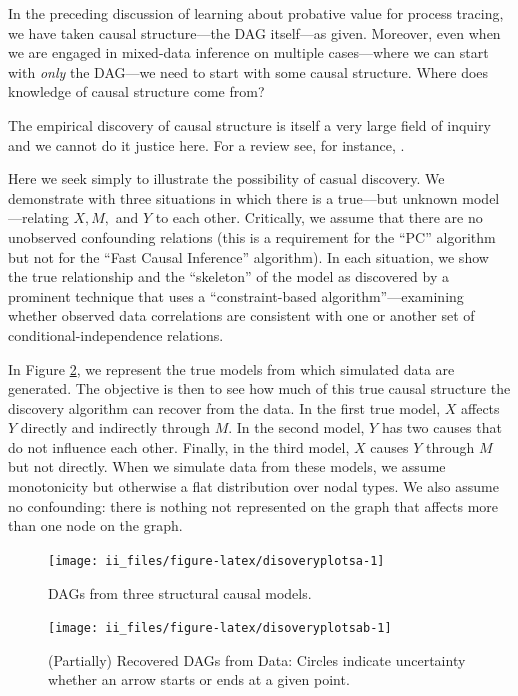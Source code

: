 \documentclass[
  12pt,
]{book}
\begin{document}
In the preceding discussion of learning about probative value for process tracing, we have taken causal structure---the DAG itself---as given. Moreover, even when we are engaged in mixed-data inference on multiple cases---where we can start with \emph{only} the DAG---we need to start with some causal structure. Where does knowledge of causal structure come from?

The empirical discovery of causal structure is itself a very large field of inquiry and we cannot do it justice here. For a review see, for instance, \citet{glymour2019review}.

Here we seek simply to illustrate the possibility of casual discovery. We demonstrate with three situations in which there is a true---but unknown model---relating \(X,M,\) and \(Y\) to each other. Critically, we assume that there are no unobserved confounding relations (this is a requirement for the ``PC'' algorithm but not for the ``Fast Causal Inference'' algorithm). In each situation, we show the true relationship and the ``skeleton'' of the model as discovered by a prominent technique that uses a ``constraint-based algorithm''---examining whether observed data correlations are consistent with one or another set of conditional-independence relations.

In Figure \ref{fig:disoveryplotsab}, we represent the true models from which simulated data are generated. The objective is then to see how much of this true causal structure the discovery algorithm can recover from the data. In the first true model, \(X\) affects \(Y\) directly and indirectly through \(M\). In the second model, \(Y\) has two causes that do not influence each other. Finally, in the third model, \(X\) causes \(Y\) through \(M\) but not directly. When we simulate data from these models, we assume monotonicity but otherwise a flat distribution over nodal types. We also assume no confounding: there is nothing not represented on the graph that affects more than one node on the graph.

\begin{figure}

{\centering \texttt{[image: ii\_files/figure-latex/disoveryplotsa-1]} 

}

\caption{DAGs from three structural causal models.}\label{fig:disoveryplotsa}
\end{figure}

\begin{figure}

{\centering \texttt{[image: ii\_files/figure-latex/disoveryplotsab-1]} 

}

\caption{(Partially) Recovered DAGs from Data: Circles indicate uncertainty whether an arrow starts or ends at a given point.}\label{fig:disoveryplotsab}
\end{figure}
\end{document}
